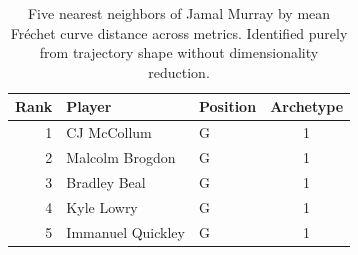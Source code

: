 \begin{table}[htbp]
  \centering\small
  \begin{tabular}{rllc}
    \toprule
    Rank & Player & Position & Archetype \\
    \midrule
    1 & CJ McCollum & G & 1 \\
    2 & Malcolm Brogdon & G & 1 \\
    3 & Bradley Beal & G & 1 \\
    4 & Kyle Lowry & G & 1 \\
    5 & Immanuel Quickley & G & 1 \\
    \bottomrule
  \end{tabular}
  \caption{Five nearest neighbors of Jamal Murray by mean Fr\'{e}chet curve distance across metrics. Identified purely from trajectory shape without dimensionality reduction.}
  \label{tab:Jamal_Murray_frechet_curve_neighbors}
\end{table}

